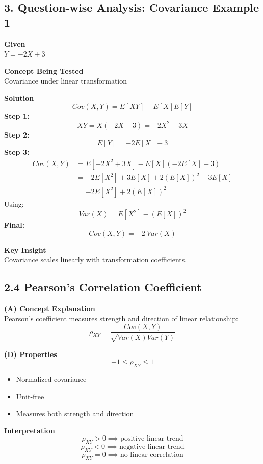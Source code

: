 \documentclass[12pt]{article}
\begin{document}
\subsection*{3. Question-wise Analysis: Covariance Example 1}

\textbf{Given} \\
$Y=-2X+3$

\textbf{Concept Being Tested} \\
Covariance under linear transformation

\textbf{Solution}
\[ \boxed{Cov(X,Y)=E[XY]-E[X]E[Y]} \]
\textbf{Step 1:}
\[ XY = X(-2X+3) = -2X^{2}+3X \]
\textbf{Step 2:}
\[ E[Y] = -2E[X]+3 \]
\textbf{Step 3:}
\begin{align*}
Cov(X,Y) &= E[-2X^{2}+3X]-E[X](-2E[X]+3) \\
&= -2E[X^{2}]+3E[X]+2(E[X])^{2}-3E[X] \\
&= -2E[X^{2}]+2(E[X])^{2}
\end{align*}
Using:
\[ \boxed{Var(X)=E[X^{2}]-(E[X])^{2}} \]
\textbf{Final:}
\[ \boxed{Cov(X,Y)=-2~Var(X)} \]

\textbf{Key Insight} \\
Covariance scales linearly with transformation coefficients.

\hrulefill

\subsection*{2.4 Pearson's Correlation Coefficient}

\textbf{(A) Concept Explanation} \\
Pearson's coefficient measures strength and direction of linear relationship:
\[ \boxed{\rho_{XY}=\frac{Cov(X,Y)}{\sqrt{Var(X)Var(Y)}}} \]

\textbf{(D) Properties}
\[ \boxed{-1 \le \rho_{XY} \le 1} \]
\begin{itemize}[noitemsep]
    \item Normalized covariance
    \item Unit-free
    \item Measures both strength and direction
\end{itemize}

\textbf{Interpretation}
\[ \boxed{\rho_{XY}>0 \implies \text{positive linear trend}} \]
\[ \boxed{\rho_{XY}<0 \implies \text{negative linear trend}} \]
\[ \boxed{\rho_{XY}=0 \implies \text{no linear correlation}} \]

\hrulefill
\end{document}
